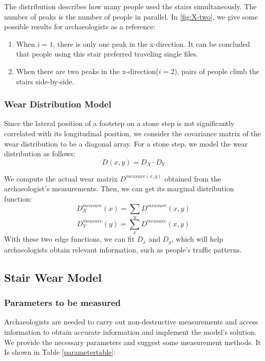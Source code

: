 \documentclass[12pt]{article}  %
\numberwithin{equation}{section} %
\begin{document}
The distribution describes how many people used the stairs simultaneously. The number of peaks is the number of people in parallel. In \autoref{fig:X-two}, we give some possible results for archaeologists as a reference: 
\begin{enumerate}[\bfseries 1.]
	\setlength{\parsep}{0ex} %
	\setlength{\topsep}{-1ex} %
	\setlength{\itemsep}{0ex} %
	\item When $i=1$, there is only one peak in the x-direction. It can be concluded that people using this stair preferred traveling single files. 
	\item When there are two peaks in the x-direction($i=2$), pairs of people climb the stairs side-by-side.  
\end{enumerate}
\subsubsection{Wear Distribution Model}
Since the lateral position of a footstep on a stone step is not significantly correlated with its longitudinal position, we consider the covariance matrix of the wear distribution to be a diagonal array. For a stone step, we model the wear distribution as follows:
\begin{equation}
    D(x,y)=D_X\cdot{D_Y}
\end{equation}

We compute the actual wear matrix $D^{measure(x,y)}$ obtained from the archaeologist's measurements. Then, we can get its marginal distribution function:
\begin{equation}
    D_X^{measure}(x)=\sum_y{D^{measure}(x,y)}
\end{equation}
\vspace{-1.0em}
\begin{equation}
    D_Y^{measure}(y)=\sum_x{D^{measure}(x,y)}
\end{equation}
With these two edge functions, we can fit $D_x$ and $D_y$, which will help archaeologists obtain relevant information, such as people's traffic patterns.
\subsection{Stair Wear Model}
\subsubsection{Parameters to be measured}
Archaeologists are needed to carry out non-destructive measurements and access information to obtain accurate information and implement the model's solution. We provide the necessary parameters and suggest some measurement methods. It Is shown in Table \ref{parametertable}:
\end{document}
